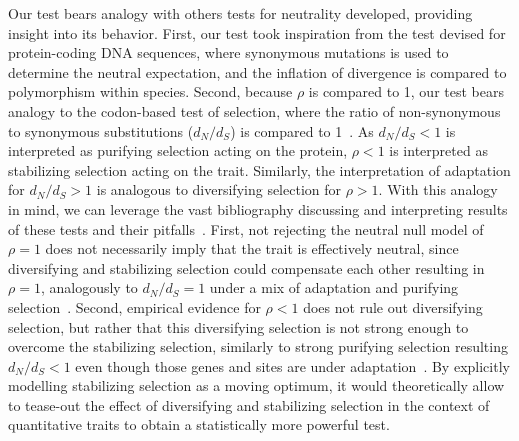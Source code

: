 \documentclass{article}
\newcommand{\dn}{d_N}
\newcommand{\ds}{d_S}
\newcommand{\dnds}{\dn / \ds}
\newcommand{\NI}{\rho}
\begin{document}
Our test bears analogy with others tests for neutrality developed, providing insight into its behavior.
First, our test took inspiration from the \textcite{mcdonald_adaptative_1991} test devised for protein-coding DNA sequences, where synonymous mutations is used to determine the neutral expectation, and the inflation of divergence is compared to polymorphism within species.
Second, because $\NI$ is compared to 1, our test bears analogy to the codon-based test of selection, where the ratio of non-synonymous to synonymous substitutions ($\dnds$) is compared to 1~\cite{goldman_codonbased_1994, muse_likelihood_1994}.
As $\dnds < 1$ is interpreted as purifying selection acting on the protein, $\NI < 1$ is interpreted as stabilizing selection acting on the trait.
Similarly, the interpretation of adaptation for $\dnds > 1$ is analogous to diversifying selection for $\NI > 1$.
With this analogy in mind, we can leverage the vast bibliography discussing and interpreting results of these tests and their pitfalls~\cite{nielsen_molecular_2005, anisimova_investigating_2009, jensen_importance_2019}.
First, not rejecting the neutral null model of $\NI = 1$ does not necessarily imply that the trait is effectively neutral, since diversifying and stabilizing selection could compensate each other resulting in $\NI = 1$, analogously to $\dnds=1$ under a mix of adaptation and purifying selection~\cite{nielsen_molecular_2005}.
Second, empirical evidence for $\NI < 1$ does not rule out diversifying selection, but rather that this diversifying selection is not strong enough to overcome the stabilizing selection, similarly to strong purifying selection resulting $\dnds < 1$ even though those genes and sites are under adaptation~\cite{latrille_genes_2023}.
By explicitly modelling stabilizing selection as a moving optimum, it would theoretically allow to tease-out the effect of diversifying and stabilizing selection in the context of quantitative traits to obtain a statistically more powerful test.
\end{document}
